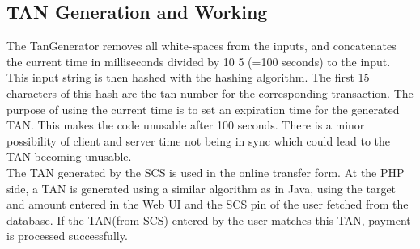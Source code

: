 \subsection{TAN Generation and Working}
The TanGenerator removes all white-spaces from the inputs, and concatenates the current time in milliseconds divided by 10 5 (=100 seconds) to the input. This input string is then hashed with the  hashing
algorithm. The first 15 characters of this hash are the tan number for the corresponding transaction.
The purpose of using the current time is to set an expiration time for the generated TAN. This makes the code unusable after 100 seconds. There is a minor possibility of client and server time not being in sync which could lead to the TAN becoming unusable. \\

The TAN generated by the SCS is used in the online transfer form. 
At the PHP side, a TAN is generated using a similar algorithm as in Java, using
the target and amount entered in the Web UI and the SCS pin of the user fetched
from the database. If the TAN(from SCS) entered by the user matches this TAN,
payment is processed successfully. \\

